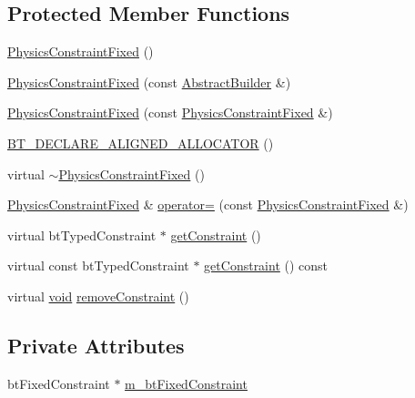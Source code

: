 \subsection*{Protected Member Functions}
\begin{DoxyCompactItemize}
\item 
\mbox{\hyperlink{classnjli_1_1_physics_constraint_fixed_ad7c29d1fbe102ef0df39b23e83b3a0b9}{Physics\+Constraint\+Fixed}} ()
\item 
\mbox{\hyperlink{classnjli_1_1_physics_constraint_fixed_addab0e380c07beb28bd5eda9169af956}{Physics\+Constraint\+Fixed}} (const \mbox{\hyperlink{classnjli_1_1_abstract_builder}{Abstract\+Builder}} \&)
\item 
\mbox{\hyperlink{classnjli_1_1_physics_constraint_fixed_aede93ff52f7972a0ccf6bb0825c6345b}{Physics\+Constraint\+Fixed}} (const \mbox{\hyperlink{classnjli_1_1_physics_constraint_fixed}{Physics\+Constraint\+Fixed}} \&)
\item 
\mbox{\hyperlink{classnjli_1_1_physics_constraint_fixed_a6fc29984577d1ac55a0c9c7d975c80b9}{B\+T\+\_\+\+D\+E\+C\+L\+A\+R\+E\+\_\+\+A\+L\+I\+G\+N\+E\+D\+\_\+\+A\+L\+L\+O\+C\+A\+T\+OR}} ()
\item 
virtual \mbox{\hyperlink{classnjli_1_1_physics_constraint_fixed_a87c0794e0dc3955f460ae85855f8a670}{$\sim$\+Physics\+Constraint\+Fixed}} ()
\item 
\mbox{\hyperlink{classnjli_1_1_physics_constraint_fixed}{Physics\+Constraint\+Fixed}} \& \mbox{\hyperlink{classnjli_1_1_physics_constraint_fixed_a352c9e12663cfc9f0bef958420cd27a6}{operator=}} (const \mbox{\hyperlink{classnjli_1_1_physics_constraint_fixed}{Physics\+Constraint\+Fixed}} \&)
\item 
virtual bt\+Typed\+Constraint $\ast$ \mbox{\hyperlink{classnjli_1_1_physics_constraint_fixed_aacec008844d5aa73eb2763855607a688}{get\+Constraint}} ()
\item 
virtual const bt\+Typed\+Constraint $\ast$ \mbox{\hyperlink{classnjli_1_1_physics_constraint_fixed_acd6e7d3872dc19e5bab285fddc2fb2f3}{get\+Constraint}} () const
\item 
virtual \mbox{\hyperlink{_thread_8h_af1e856da2e658414cb2456cb6f7ebc66}{void}} \mbox{\hyperlink{classnjli_1_1_physics_constraint_fixed_a6b0a9ef970808875deef88a91f59f8b7}{remove\+Constraint}} ()
\end{DoxyCompactItemize}
\subsection*{Private Attributes}
\begin{DoxyCompactItemize}
\item 
bt\+Fixed\+Constraint $\ast$ \mbox{\hyperlink{classnjli_1_1_physics_constraint_fixed_aa84989fdbd81cb13f6d09150cc22dd8c}{m\+\_\+bt\+Fixed\+Constraint}}
\end{DoxyCompactItemize}
